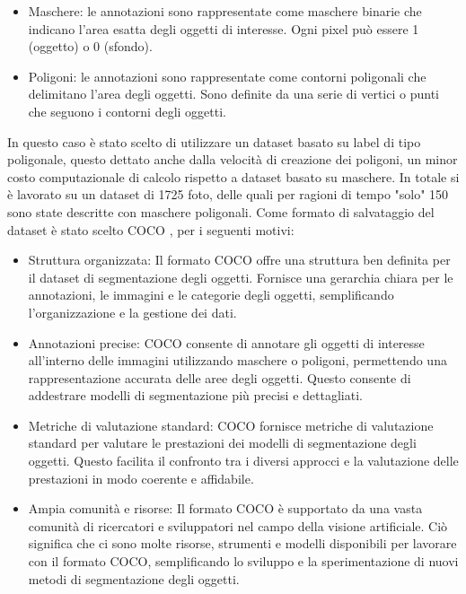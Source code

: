 \documentclass[a4paper,12pt]{report}
\begin{document}
      \begin{itemize}
        \item Maschere: le annotazioni sono rappresentate come maschere binarie che indicano l'area esatta degli oggetti di interesse. Ogni pixel può essere 1 (oggetto) o 0 (sfondo).
        \item Poligoni: le annotazioni sono rappresentate come contorni poligonali che delimitano l'area degli oggetti. Sono definite da una serie di vertici o punti che seguono i contorni degli oggetti.
      \end{itemize}
      In questo caso è stato scelto di utilizzare un dataset basato su label di tipo poligonale,
      questo dettato anche dalla velocità di creazione dei poligoni, un minor costo computazionale 
      di calcolo rispetto a dataset basato su maschere.
      In totale si è lavorato su un dataset di 1725 foto, delle quali per ragioni
      di tempo "solo" 150 sono state descritte con maschere poligonali. 
      Come formato di salvataggio del dataset è stato scelto COCO \cite{coco}, 
      per i seguenti motivi:
      \begin{itemize}
        \item Struttura organizzata: Il formato COCO offre una struttura ben definita per il dataset di segmentazione degli oggetti. Fornisce una gerarchia chiara per le annotazioni, le immagini e le categorie degli oggetti, semplificando l'organizzazione e la gestione dei dati.
        \item Annotazioni precise: COCO consente di annotare gli oggetti di interesse all'interno delle immagini utilizzando maschere o poligoni, permettendo una rappresentazione accurata delle aree degli oggetti. Questo consente di addestrare modelli di segmentazione più precisi e dettagliati.
        \item Metriche di valutazione standard: COCO fornisce metriche di valutazione standard per valutare le prestazioni dei modelli di segmentazione degli oggetti. Questo facilita il confronto tra i diversi approcci e la valutazione delle prestazioni in modo coerente e affidabile.
        \item Ampia comunità e risorse: Il formato COCO è supportato da una vasta comunità di ricercatori e sviluppatori nel campo della visione artificiale. Ciò significa che ci sono molte risorse, strumenti e modelli disponibili per lavorare con il formato COCO, semplificando lo sviluppo e la sperimentazione di nuovi metodi di segmentazione degli oggetti.
      \end{itemize}
      \newpage
\end{document}
